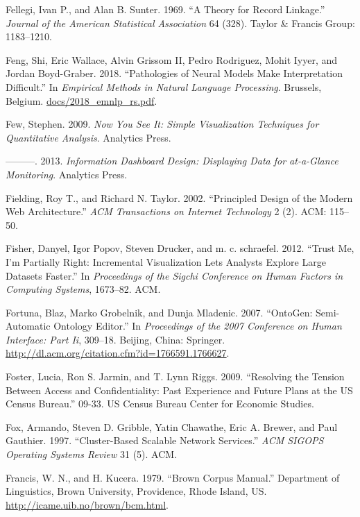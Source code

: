 \documentclass[]{krantz}
\begin{document}
\hypertarget{ref-FS69}{}
Fellegi, Ivan P., and Alan B. Sunter. 1969. ``A Theory for Record
Linkage.'' \emph{Journal of the American Statistical Association} 64
(328). Taylor \& Francis Group: 1183--1210.

\hypertarget{ref-feng-18}{}
Feng, Shi, Eric Wallace, Alvin Grissom II, Pedro Rodriguez, Mohit Iyyer,
and Jordan Boyd-Graber. 2018. ``Pathologies of Neural Models Make
Interpretation Difficult.'' In \emph{Empirical Methods in Natural
Language Processing}. Brussels, Belgium. \url{docs/2018_emnlp_rs.pdf}.

\hypertarget{ref-few2009now}{}
Few, Stephen. 2009. \emph{Now You See It: Simple Visualization
Techniques for Quantitative Analysis}. Analytics Press.

\hypertarget{ref-few2013information}{}
---------. 2013. \emph{Information Dashboard Design: Displaying Data for
at-a-Glance Monitoring}. Analytics Press.

\hypertarget{ref-fielding2002principled}{}
Fielding, Roy T., and Richard N. Taylor. 2002. ``Principled Design of
the Modern Web Architecture.'' \emph{ACM Transactions on Internet
Technology} 2 (2). ACM: 115--50.

\hypertarget{ref-fisher2012trust}{}
Fisher, Danyel, Igor Popov, Steven Drucker, and m. c. schraefel. 2012.
``Trust Me, I'm Partially Right: Incremental Visualization Lets Analysts
Explore Large Datasets Faster.'' In \emph{Proceedings of the Sigchi
Conference on Human Factors in Computing Systems}, 1673--82. ACM.

\hypertarget{ref-Ontogen}{}
Fortuna, Blaz, Marko Grobelnik, and Dunja Mladenic. 2007. ``OntoGen:
Semi-Automatic Ontology Editor.'' In \emph{Proceedings of the 2007
Conference on Human Interface: Part Ii}, 309--18. Beijing, China:
Springer. \url{http://dl.acm.org/citation.cfm?id=1766591.1766627}.

\hypertarget{ref-foster2009resolving}{}
Foster, Lucia, Ron S. Jarmin, and T. Lynn Riggs. 2009. ``Resolving the
Tension Between Access and Confidentiality: Past Experience and Future
Plans at the US Census Bureau.'' 09-33. US Census Bureau Center for
Economic Studies.

\hypertarget{ref-fox1997cluster}{}
Fox, Armando, Steven D. Gribble, Yatin Chawathe, Eric A. Brewer, and
Paul Gauthier. 1997. ``Cluster-Based Scalable Network Services.''
\emph{ACM SIGOPS Operating Systems Review} 31 (5). ACM.

\hypertarget{ref-browncorpus}{}
Francis, W. N., and H. Kucera. 1979. ``Brown Corpus Manual.'' Department
of Linguistics, Brown University, Providence, Rhode Island, US.
\url{http://icame.uib.no/brown/bcm.html}.
\end{document}
